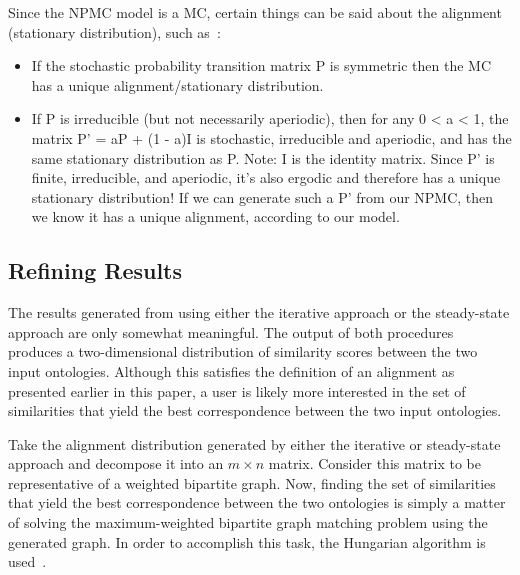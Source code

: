 \documentclass[letterpaper,twocolumn,12pt]{article}
\begin{document}
Since the NPMC model is a MC, certain things can be said about the alignment (stationary distribution), such as~\cite{mitzenmacher:2005:probability}:

\begin{itemize}
\item If the stochastic probability transition matrix P is symmetric then the MC has a unique alignment/stationary distribution.
\item If P is irreducible (but not necessarily aperiodic), then for any 0 < a < 1, the matrix P' = aP + (1 - a)I is stochastic, irreducible and aperiodic, and has the same stationary distribution as P. Note: I is the identity matrix.
Since P' is finite, irreducible, and aperiodic, it's also ergodic and therefore has a unique stationary distribution!
If we can generate such a P' from our NPMC, then we know it has a unique alignment, according to our model.
\end{itemize}

\subsection{Refining Results}

The results generated from using either the iterative approach or the steady-state approach are only somewhat meaningful.
The output of both procedures produces a two-dimensional distribution of similarity scores between the two input ontologies.
Although this satisfies the definition of an alignment as presented earlier in this paper, a user is likely more interested in the set of similarities that yield the best correspondence between the two input ontologies.

Take the alignment distribution generated by either the iterative or steady-state approach and decompose it into an $m \times n$ matrix.
Consider this matrix to be representative of a weighted bipartite graph.
Now, finding the set of similarities that yield the best correspondence between the two ontologies is simply a matter of solving the maximum-weighted bipartite graph matching problem using the generated graph.
In order to accomplish this task, the Hungarian algorithm is used~\cite{kuhn:1955:hungarian}.


%
\end{document}
